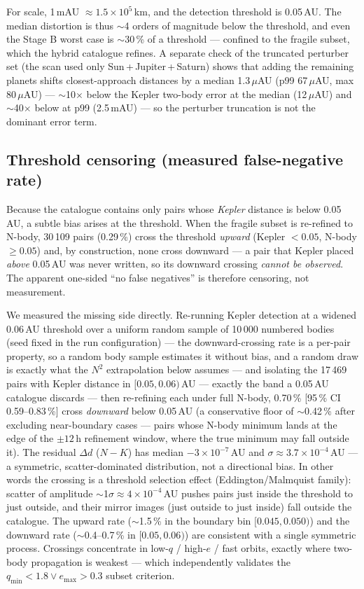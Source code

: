 \documentclass{aa}
\begin{document}
For scale, 1\,mAU $\approx 1.5\times10^{5}$\,km, and the detection threshold is
0.05\,AU. The median distortion is thus $\sim$4 orders of magnitude below the
threshold, and even the Stage B worst case is $\sim$30\,\% of a threshold ---
confined to the fragile subset, which the hybrid catalogue refines. A separate
check of the truncated perturber set (the scan used only
Sun\,+\,Jupiter\,+\,Saturn) shows that adding the remaining planets shifts
closest-approach distances by a median 1.3\,$\mu$AU (p99 67\,$\mu$AU, max
80\,$\mu$AU) --- $\sim$10$\times$ below the Kepler two-body error at the median
(12\,$\mu$AU) and $\sim$40$\times$ below at p99 (2.5\,mAU) --- so the
perturber truncation is not the dominant error term.

\subsection{Threshold censoring (measured false-negative rate)}
\label{sec:censoring}

Because the catalogue contains only pairs whose \emph{Kepler} distance is below
0.05\,AU, a subtle bias arises at the threshold. When the fragile subset is
re-refined to N-body, 30\,109 pairs (0.29\,\%) cross the threshold
\emph{upward} (Kepler $<0.05$, N-body $\geq0.05$) and, by construction, none
cross downward --- a pair that Kepler placed \emph{above} 0.05\,AU was never
written, so its downward crossing \emph{cannot be observed}. The apparent
one-sided ``no false negatives'' is therefore censoring, not measurement.

We measured the missing side directly. Re-running Kepler detection at a widened
0.06\,AU threshold over a uniform random sample of 10\,000 numbered bodies (seed
fixed in the run configuration) --- the downward-crossing rate is a per-pair
property, so a random body sample estimates it without bias, and a random draw is
exactly what the $N^2$ extrapolation below assumes --- and isolating
the 17\,469 pairs with Kepler distance in $[0.05, 0.06)$\,AU --- exactly the band a 0.05\,AU
catalogue discards --- then re-refining each under full N-body, 0.70\,\%
[95\,\% CI 0.59--0.83\,\%] cross \emph{downward} below 0.05\,AU (a conservative
floor of $\sim$0.42\,\% after excluding near-boundary cases --- pairs whose
N-body minimum lands at the edge of the $\pm12$\,h refinement window, where the
true minimum may fall outside it). The residual
$\Delta d$ ($N-K$) has median $-3\times10^{-7}$\,AU and $\sigma\approx
3.7\times10^{-4}$\,AU --- a symmetric, scatter-dominated distribution, not a
directional bias. In other words the crossing is a threshold selection effect
(Eddington/Malmquist family): scatter of amplitude
$\sim$1$\sigma\approx4\times10^{-4}$\,AU pushes pairs just inside the threshold
to just outside, and their mirror images (just outside to just inside) fall
outside the catalogue. The upward rate ($\sim$1.5\,\% in the boundary bin
$[0.045, 0.050)$) and the downward rate ($\sim$0.4--0.7\,\% in $[0.05, 0.06)$)
are consistent with a single symmetric process. Crossings concentrate in
low-$q$ / high-$e$ / fast orbits, exactly where two-body propagation is
weakest --- which independently validates the $q_{\min}<1.8 \lor e_{\max}>0.3$
subset criterion.
\end{document}
